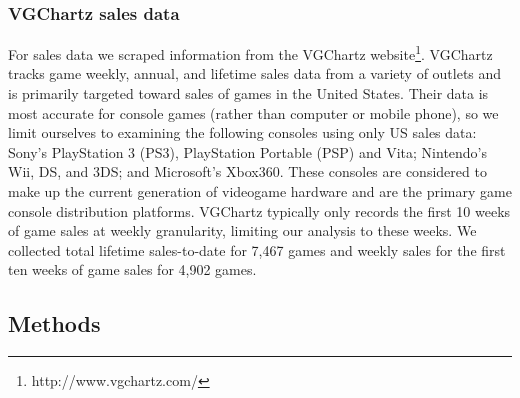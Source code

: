 \documentclass[letterpaper]{article}
\begin{document}
\subsubsection{VGChartz sales data}
For sales data we scraped information from the VGChartz website\footnote{http://www.vgchartz.com/}. VGChartz tracks game weekly, annual, and lifetime sales data from a variety of outlets and is primarily targeted toward sales of games in the United States. Their data is most accurate for console games (rather than computer or mobile phone), so we limit ourselves to examining the following consoles using only US sales data: Sony's PlayStation 3 (PS3), PlayStation Portable (PSP) and Vita; Nintendo's Wii, DS, and 3DS; and Microsoft's Xbox360. These consoles are considered to make up the current generation of videogame hardware and are the primary game console distribution platforms. VGChartz typically only records the first 10 weeks of game sales at weekly granularity, limiting our analysis to these weeks. We collected total lifetime sales-to-date for 7,467 games and weekly sales for the first ten weeks of game sales for 4,902 games.

\subsection{Methods}
\end{document}
